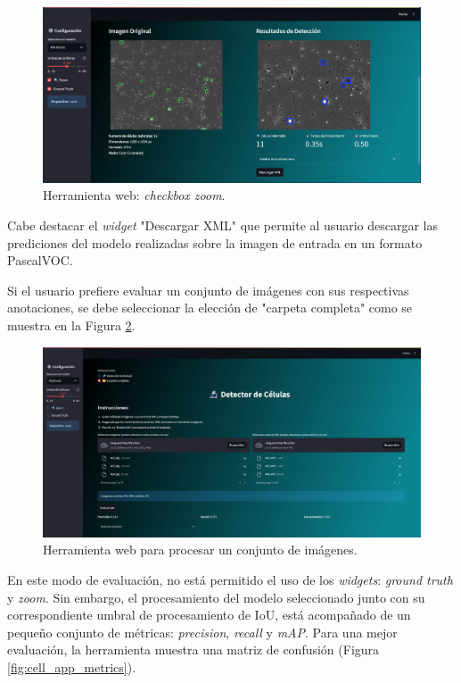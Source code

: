 \documentclass[12pt,a4paper,onecolumn,oneside]{report}
\begin{document}
\begin{figure}[htbp]
  \centering
  \includegraphics[width=1.0\textwidth]{figuras/app/zoom_imagen.png}
  \caption{Herramienta web: \textit{checkbox zoom}.}
  \label{fig:cell_app_zoom}
\end{figure}

Cabe destacar el \textit{widget} "Descargar XML" que permite al usuario descargar las prediciones del modelo realizadas sobre la imagen de entrada en un formato
PascalVOC. 

Si el usuario prefiere evaluar un conjunto de imágenes con sus respectivas anotaciones, se debe seleccionar la elección de "carpeta completa" como se muestra en la Figura \ref{fig:cell_app_directory}.

\begin{figure}[htbp]
  \centering
  \includegraphics[width=1.0\textwidth]{figuras/app/cell_app_directorio.png}
  \caption{Herramienta web para procesar un conjunto de imágenes.}
  \label{fig:cell_app_directory}
\end{figure}

En este modo de evaluación, no está permitido el uso de los \textit{widgets}: \textit{ground truth} y \textit{zoom}. Sin embargo, 
el procesamiento del modelo seleccionado junto con su correspondiente umbral de procesamiento de IoU, está acompañado de un pequeño conjunto de métricas:
\textit{precision}, \textit{recall} y \textit{mAP}. Para una mejor evaluación, la herramienta muestra una matriz de confusión (Figura \ref{fig:cell_app_metrics}).
\end{document}
